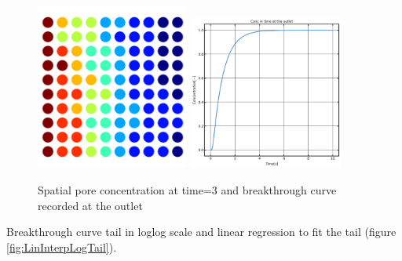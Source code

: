 \documentclass{article}
\begin{document}
\begin{figure}[htbp!]
    \centering
    \includegraphics[width=0.45\textwidth]{images/fromOpenPNM/poreConcTime3.png}
    \hspace{0.05\textwidth}
    \includegraphics[width=0.45\textwidth]{images/fromOpenPNM/linearBTC.png}
    \caption{Spatial pore concentration at time=3 and breakthrough curve recorded at the outlet}
    \label{fig:LinBTC}
\end{figure}
Breakthrough curve tail in loglog scale and linear regression to fit the tail (figure \ref{fig:LinInterpLogTail}).
\end{document}

